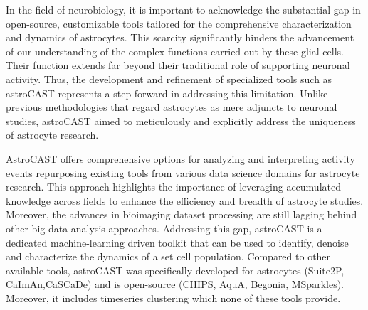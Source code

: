 In the field of neurobiology, it is important to acknowledge the substantial gap in open-source, customizable tools tailored for the comprehensive characterization and dynamics of astrocytes. This scarcity significantly hinders the advancement of our understanding of the complex functions carried out by these glial cells. Their function extends far beyond their traditional role of supporting neuronal activity\citep{montalant_role_2021,ransom_new_2003}. Thus, the development and refinement of specialized tools such as astroCAST represents a step forward in addressing this limitation. Unlike previous methodologies that regard astrocytes as mere adjuncts to neuronal studies, astroCAST aimed to meticulously and explicitly address the uniqueness of astrocyte research.

AstroCAST offers comprehensive options for analyzing and interpreting activity events repurposing existing tools from various data science domains for astrocyte research. This approach highlights the importance of leveraging accumulated knowledge across fields to enhance the efficiency and breadth of astrocyte studies. Moreover, the advances in bioimaging dataset processing are still lagging behind other big data analysis approaches. Addressing this gap, astroCAST is a dedicated machine-learning driven toolkit that can be used to identify, denoise and characterize the dynamics of a set cell population. Compared to other available tools, astroCAST was specifically developed for astrocytes (Suite2P\citep{pachitariu_suite2p_2017}, CaImAn\citep{giovannucci_caiman_2019},CaSCaDe\citep{rupprecht_database_2021}) and is open-source (CHIPS\citep{barrett_chips_2018}, AquA\citep{wang_event-based_2018}, Begonia\citep{bjornstad_begoniatwo-photon_2021}, MSparkles\citep{stopper_novel_2022}). Moreover, it includes timeseries clustering which none of these tools provide.

